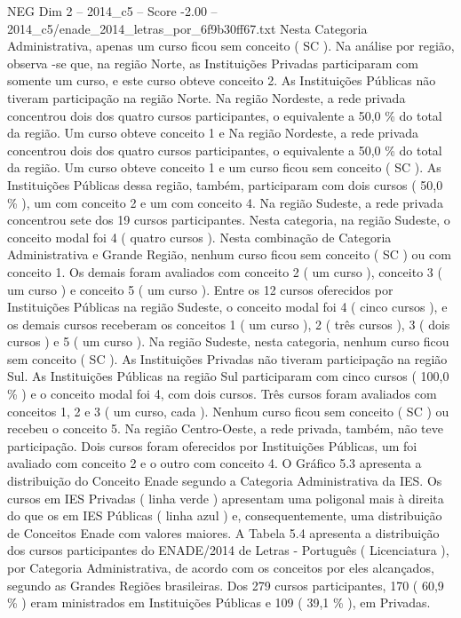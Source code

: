 \begin{textsample}{NEG Dim 2 – 2014\_c5 – Score -2.00 – 2014\_c5/enade\_2014\_letras\_por\_6f9b30ff67.txt}
Nesta Categoria Administrativa, apenas um curso ficou sem conceito ( SC ).
Na análise por região, observa -se que, na região Norte, as Instituições Privadas participaram com somente um curso, e este curso obteve conceito 2.
As Instituições Públicas não tiveram participação na região Norte.
Na região Nordeste, a rede privada concentrou dois dos quatro cursos participantes, o equivalente a 50,0 \% do total da região.
Um curso obteve conceito 1 e Na região Nordeste, a rede privada concentrou dois dos quatro cursos participantes, o equivalente a 50,0 \% do total da região.
Um curso obteve conceito 1 e um curso ficou sem conceito ( SC ).
As Instituições Públicas dessa região, também, participaram com dois cursos ( 50,0 \% ), um com conceito 2 e um com conceito 4.
Na região Sudeste, a rede privada concentrou sete dos 19 cursos participantes.
Nesta categoria, na região Sudeste, o conceito modal foi 4 ( quatro cursos ).
Nesta combinação de Categoria Administrativa e Grande Região, nenhum curso ficou sem conceito ( SC ) ou com conceito 1.
Os demais foram avaliados com conceito 2 ( um curso ), conceito 3 ( um curso ) e conceito 5 ( um curso ).
Entre os 12 cursos oferecidos por Instituições Públicas na região Sudeste, o conceito modal foi 4 ( cinco cursos ), e os demais cursos receberam os conceitos 1 ( um curso ), 2 ( três cursos ), 3 ( dois cursos ) e 5 ( um curso ).
Na região Sudeste, nesta categoria, nenhum curso ficou sem conceito ( SC ).
As Instituições Privadas não tiveram participação na região Sul.
As Instituições Públicas na região Sul participaram com cinco cursos ( 100,0 \% ) e o conceito modal foi 4, com dois cursos.
Três cursos foram avaliados com conceitos 1, 2 e 3 ( um curso, cada ).
Nenhum curso ficou sem conceito ( SC ) ou recebeu o conceito 5.
Na região Centro-Oeste, a rede privada, também, não teve participação.
Dois cursos foram oferecidos por Instituições Públicas, um foi avaliado com conceito 2 e o outro com conceito 4.
O Gráfico 5.3 apresenta a distribuição do Conceito Enade segundo a Categoria Administrativa da IES.
Os cursos em IES Privadas ( linha verde ) apresentam uma poligonal mais à direita do que os em IES Públicas ( linha azul ) e, consequentemente, uma distribuição de Conceitos Enade com valores maiores.
A Tabela 5.4 apresenta a distribuição dos cursos participantes do ENADE/2014 de Letras - Português ( Licenciatura ), por Categoria Administrativa, de acordo com os conceitos por eles alcançados, segundo as Grandes Regiões brasileiras.
Dos 279 cursos participantes, 170 ( 60,9 \% ) eram ministrados em Instituições Públicas e 109 ( 39,1 \% ), em Privadas.

\end{textsample}
